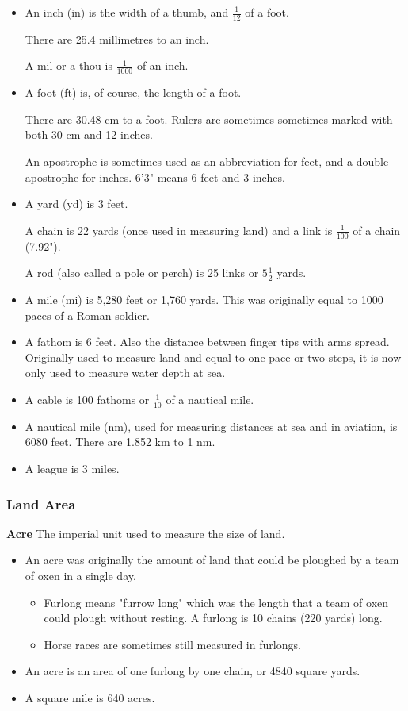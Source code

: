 \documentclass{article}
\begin{document}
\begin{itemize}
\item An inch (in) is the width of a thumb, and $\frac{1}{12}$ of a foot.

There are 25.4 millimetres to an inch.

A mil or a thou is $\frac{1}{1000}$ of an inch.

\item A foot (ft) is, of course, the length of a foot.

There are 30.48 cm to a foot. Rulers are sometimes sometimes marked with both 30 cm and 12 inches.

An apostrophe is sometimes used as an abbreviation for feet, and a double apostrophe for inches. 6'3" means 6 feet and 3 inches.

\item A yard (yd) is 3 feet.

A chain is 22 yards (once used in measuring land) and a link is $\frac{1}{100}$ of a chain (7.92").

A rod (also called a pole or perch) is 25 links or $5\frac{1}{2}$ yards.

\item A mile (mi) is 5,280 feet or 1,760 yards. This was originally equal to 1000 paces of a Roman soldier.

\item A fathom is 6 feet. Also the distance between finger tips with arms spread. Originally used to measure land and equal to one pace or two steps, it is now only used to measure water depth at sea.

\item A cable is 100 fathoms or $\frac{1}{10}$ of a nautical mile.

\item A nautical mile (nm), used for measuring distances at sea and in aviation, is 6080 feet. There are 1.852 km to 1 nm.

\item A league is 3 miles.
\end{itemize}

\subsubsection*{Land Area}
\textbf{Acre} The imperial unit used to measure the size of land.
\begin{itemize}
\item An acre was originally the amount of land that could be ploughed by a team of oxen in a single day.
  \begin{itemize}
  \item Furlong means "furrow long" which was the length that a team of oxen could plough without resting. A furlong is 10 chains (220 yards) long.
  \item Horse races are sometimes still measured in furlongs.
  \end{itemize}
\item An acre is an area of one furlong by one chain, or 4840 square yards.
\item A square mile is 640 acres.
\end{itemize}
\end{document}
